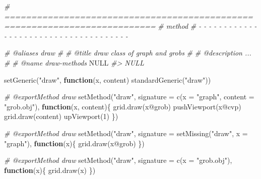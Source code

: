 \documentclass[
]{article}
\newenvironment{Shaded}{\begin{snugshade}}{\end{snugshade}}
\newcommand{\AttributeTok}[1]{\textcolor[rgb]{0.77,0.63,0.00}{#1}}
\newcommand{\CommentTok}[1]{\textcolor[rgb]{0.56,0.35,0.01}{\textit{#1}}}
\newcommand{\ConstantTok}[1]{\textcolor[rgb]{0.00,0.00,0.00}{#1}}
\newcommand{\ControlFlowTok}[1]{\textcolor[rgb]{0.13,0.29,0.53}{\textbf{#1}}}
\newcommand{\DecValTok}[1]{\textcolor[rgb]{0.00,0.00,0.81}{#1}}
\newcommand{\FunctionTok}[1]{\textcolor[rgb]{0.00,0.00,0.00}{#1}}
\newcommand{\NormalTok}[1]{#1}
\newcommand{\SpecialCharTok}[1]{\textcolor[rgb]{0.00,0.00,0.00}{#1}}
\newcommand{\StringTok}[1]{\textcolor[rgb]{0.31,0.60,0.02}{#1}}
\begin{document}
\begin{Shaded}
\begin{Highlighting}[]
\CommentTok{\# ==========================================================================}
\CommentTok{\# method}
\CommentTok{\# {-} {-} {-} {-} {-} {-} {-} {-} {-} {-} {-} {-} {-} {-} {-} {-} {-} {-} {-} {-} {-} {-} {-} {-} {-} {-} {-} {-} {-} {-} {-} {-} {-} {-} {-} {-} {-}}

\CommentTok{\#\textquotesingle{} @aliases draw}
\CommentTok{\#\textquotesingle{}}
\CommentTok{\#\textquotesingle{} @title draw class of \textquotesingle{}graph\textquotesingle{} and \textquotesingle{}grobs\textquotesingle{}}
\CommentTok{\#\textquotesingle{}}
\CommentTok{\#\textquotesingle{} @description ...}
\CommentTok{\#\textquotesingle{}}
\CommentTok{\#\textquotesingle{} @name draw{-}methods}
\ConstantTok{NULL}
\CommentTok{\#\textgreater{} NULL}

\FunctionTok{setGeneric}\NormalTok{(}\StringTok{"draw"}\NormalTok{, }
  \ControlFlowTok{function}\NormalTok{(x, content)}
    \FunctionTok{standardGeneric}\NormalTok{(}\StringTok{"draw"}\NormalTok{))}

\CommentTok{\#\textquotesingle{} @exportMethod draw}
\FunctionTok{setMethod}\NormalTok{(}\StringTok{"draw"}\NormalTok{, }
  \AttributeTok{signature =} \FunctionTok{c}\NormalTok{(}\AttributeTok{x =} \StringTok{"graph"}\NormalTok{, }\AttributeTok{content =} \StringTok{"grob.obj"}\NormalTok{),}
  \ControlFlowTok{function}\NormalTok{(x, content)\{}
    \FunctionTok{grid.draw}\NormalTok{(x}\SpecialCharTok{@}\NormalTok{grob)}
    \FunctionTok{pushViewport}\NormalTok{(x}\SpecialCharTok{@}\NormalTok{cvp)}
    \FunctionTok{grid.draw}\NormalTok{(content)}
    \FunctionTok{upViewport}\NormalTok{(}\DecValTok{1}\NormalTok{)}
\NormalTok{  \})}

\CommentTok{\#\textquotesingle{} @exportMethod draw}
\FunctionTok{setMethod}\NormalTok{(}\StringTok{"draw"}\NormalTok{, }
  \AttributeTok{signature =} \FunctionTok{setMissing}\NormalTok{(}\StringTok{"draw"}\NormalTok{,}
    \AttributeTok{x =} \StringTok{"graph"}\NormalTok{),}
  \ControlFlowTok{function}\NormalTok{(x)\{}
    \FunctionTok{grid.draw}\NormalTok{(x}\SpecialCharTok{@}\NormalTok{grob)}
\NormalTok{  \})}

\CommentTok{\#\textquotesingle{} @exportMethod draw}
\FunctionTok{setMethod}\NormalTok{(}\StringTok{"draw"}\NormalTok{, }
  \AttributeTok{signature =} \FunctionTok{c}\NormalTok{(}\AttributeTok{x =} \StringTok{"grob.obj"}\NormalTok{),}
  \ControlFlowTok{function}\NormalTok{(x)\{}
    \FunctionTok{grid.draw}\NormalTok{(x)}
\NormalTok{  \})}


\end{Highlighting}
\end{Shaded}
\end{document}
